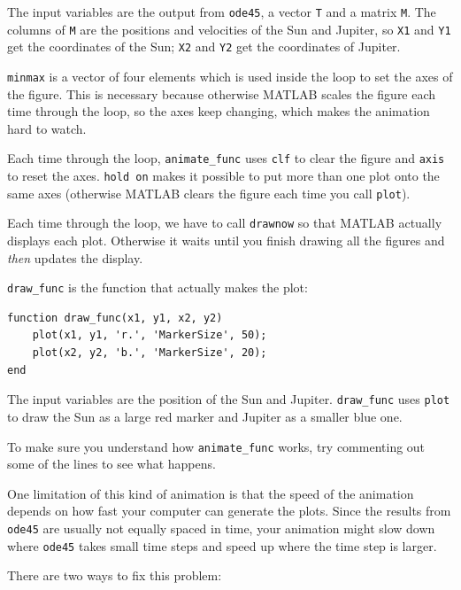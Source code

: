 \documentclass{book}
\begin{document}
The input variables are the output from {\tt ode45}, a vector
{\tt T} and a matrix {\tt M}.  The columns of {\tt M} are the
positions and velocities of the Sun and Jupiter, so
{\tt X1} and {\tt Y1} get the coordinates of the Sun;
{\tt X2} and {\tt Y2} get the coordinates of Jupiter.

{\tt minmax} is a vector of four elements which is used inside
the loop to set the axes of the figure.  This is necessary because
otherwise MATLAB scales the figure each time through the loop,
so the axes keep changing, which makes the animation hard
to watch.

Each time through the loop, {\tt animate\_func} uses {\tt clf}
to clear the figure and {\tt axis} to reset the axes.  {\tt hold
on} makes it possible to put more than one plot onto the same
axes (otherwise MATLAB clears the figure each time you call
{\tt plot}).

Each time through the loop, we have to call {\tt drawnow} so
that MATLAB actually displays each plot.  Otherwise it waits
until you finish drawing all the figures and {\em then} updates
the display.

{\tt draw\_func} is the function that actually makes the
plot:

\begin{verbatim}
function draw_func(x1, y1, x2, y2)
    plot(x1, y1, 'r.', 'MarkerSize', 50);
    plot(x2, y2, 'b.', 'MarkerSize', 20);
end
\end{verbatim}

The input variables are the position of the Sun and Jupiter.
{\tt draw\_func} uses {\tt plot} to draw
the Sun as a large red marker and Jupiter as a smaller blue one.

\begin{ex}
To make sure you understand how {\tt animate\_func} works,
try commenting out some of the lines to see what happens.
\end{ex}

One limitation of this kind of animation is that the speed
of the animation depends on how fast your computer can generate
the plots.  Since the results from {\tt ode45} are usually not
equally spaced in time, your animation might slow down where
{\tt ode45} takes small time steps and speed up where the time
step is larger.

There are two ways to fix this problem:
\end{document}
